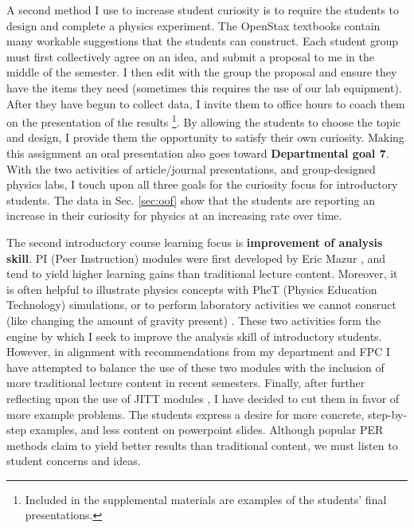 \documentclass[../../../main.tex]{subfiles}
\begin{document}
A second method I use to increase student curiosity is to require the students to design and complete a physics experiment.  The OpenStax textbooks contain many workable suggestions that the students can construct.  Each student group must first collectively agree on an idea, and submit a proposal to me in the middle of the semester.  I then edit with the group the proposal and ensure they have the items they need (sometimes this requires the use of our lab equipment).  After they have begun to collect data, I invite them to office hours to coach them on the presentation of the results \footnote{Included in the supplemental materials are examples of the students' final presentations.}.  By allowing the students to choose the topic and design, I provide them the opportunity to satisfy their own curiosity.  Making this assignment an oral presentation also goes toward \textbf{Departmental goal 7}.  With the two activities of article/journal presentations, and group-designed physics labs, I touch upon all three goals for the curiosity focus for introductory students.  The data in Sec. \ref{sec:oof} show that the students are reporting an increase in their curiosity for physics at an increasing rate over time. \\ \hspace{0.1cm}

The second introductory course learning focus is \textbf{improvement of analysis skill}.  PI (Peer Instruction) modules were first developed by Eric Mazur \cite{mazur}, and tend to yield higher learning gains than traditional lecture content.  Moreover, it is often helpful to illustrate physics concepts with PheT (Physics Education Technology) simulations, or to perform laboratory activities we cannot consruct (like changing the amount of gravity present) \cite{Phet}.  These two activities form the engine by which I seek to improve the analysis skill of introductory students.  However, in alignment with recommendations from my department and FPC I have attempted to balance the use of these two modules with the inclusion of more traditional lecture content in recent semesters.  Finally, after further reflecting upon the use of JITT modules \cite{jitt}, I have decided to cut them in favor of more example problems.  The students express a desire for more concrete, step-by-step examples, and less content on powerpoint slides.  Although popular PER methods claim to yield better results than traditional content, we must listen to student concerns and ideas. \\ \hspace{0.1cm}
\end{document}

